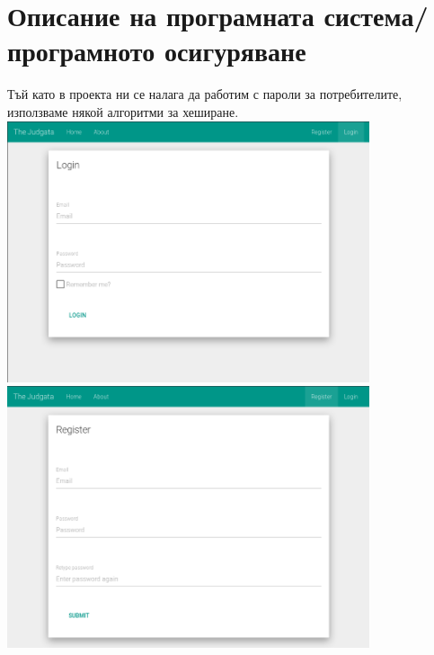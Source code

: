 \documentclass[12pt]{article}
\begin{document}
	\section{Описание на програмната система/програмното осигуряване} 
	Тъй като в проекта ни се налага да работим с пароли за потребителите, използваме някой алгоритми за хеширане. \\ \vspace {0.5cm}
	\includegraphics[width=0.80\textwidth]{login} \\ \vspace {0.5cm}
	\includegraphics[width=0.80\textwidth]{register}
	\newpage
\end{document}
